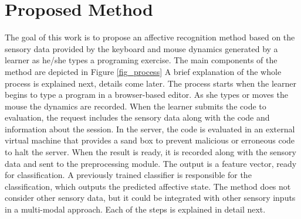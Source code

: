 \documentclass[a4paper]{llncs}
\begin{document}
\section{Proposed Method}
\label{sec:method}

The goal of this work is to propose an affective
recognition method based on the sensory data provided by the keyboard and mouse
dynamics generated by a learner as he/she types a programing exercise. The main
components of the method are depicted in Figure \ref{fig_process} A brief explanation of the
whole process is explained next, details come later. The process starts when the
learner begins to type a program in a browser-based editor. As she types or
moves the mouse the dynamics are recorded. When the learner submits the code to
evaluation, the request includes the sensory data along with the code and
information about the session. In the server, the code is evaluated in an
external virtual machine that provides a sand box to prevent malicious or
erroneous code to halt the server. When the result is ready, it is recorded
along with the sensory data and sent to the preprocessing module. The output is
a feature vector, ready for classification. A previously trained classifier is
responsible for the classification, which outputs the predicted affective state.
The method does not consider other sensory data, but it could be integrated with
other sensory inputs in a multi-modal approach.  Each of the steps is explained
in detail next.
\end{document}

